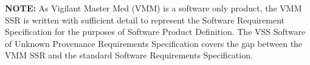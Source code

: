 \textbf{NOTE:} As Vigilant Master Med (VMM) is a software only product, the VMM
SSR is written with sufficient detail to represent the Software
Requirement Specification for the purposes of Software Product Definition.  The
VSS Software of Unknown Provenance Requirements Specification covers
the gap between the VMM SSR and the standard Software Requirements
Specification.

\tlcVspace
